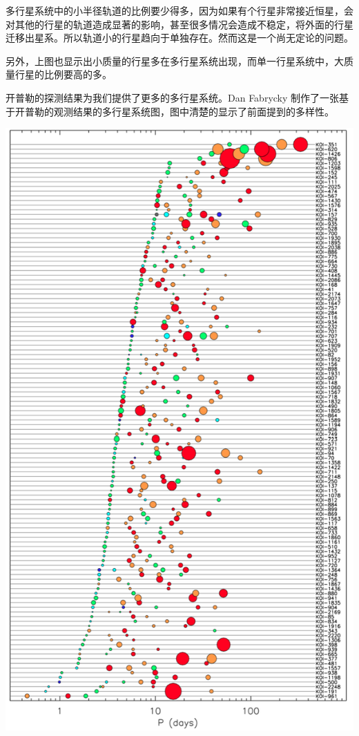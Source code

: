 \documentclass[letterpaper,10pt,english]{sphinxmanual}
\begin{document}
多行星系统中的小半径轨道的比例要少得多，因为如果有个行星非常接近恒星，会对其他的行星的轨道造成显著的影响，甚至很多情况会造成不稳定，将外面的行星迁移出星系。所以轨道小的行星趋向于单独存在。然而这是一个尚无定论的问题。

另外，上图也显示出小质量的行星多在多行星系统出现，而单一行星系统中，大质量行星的比例要高的多。

开普勒的探测结果为我们提供了更多的多行星系统。Dan Fabrycky 制作了一张基于开普勒的观测结果的多行星系统图，图中清楚的显示了前面提到的多样性。

{\hfill\includegraphics{mulitPeriod.png}\hfill}
\end{document}
